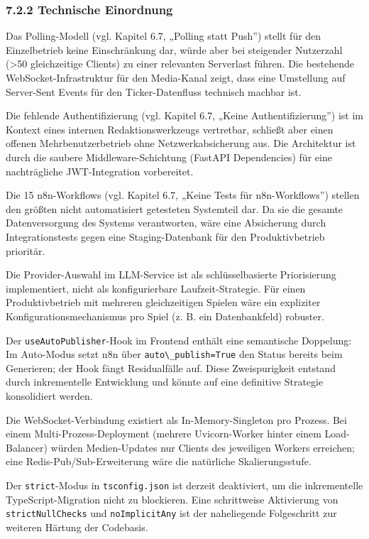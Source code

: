 \subsubsection{7.2.2 Technische Einordnung}\label{technische-einordnung}

Das Polling-Modell (vgl. Kapitel 6.7, „Polling statt Push'') stellt für
den Einzelbetrieb keine Einschränkung dar, würde aber bei steigender
Nutzerzahl (\textgreater50 gleichzeitige Clients) zu einer relevanten
Serverlast führen. Die bestehende WebSocket-Infrastruktur für den
Media-Kanal zeigt, dass eine Umstellung auf Server-Sent Events für den
Ticker-Datenfluss technisch machbar ist.

Die fehlende Authentifizierung (vgl. Kapitel 6.7, „Keine
Authentifizierung'') ist im Kontext eines internen Redaktionswerkzeugs
vertretbar, schließt aber einen offenen Mehrbenutzerbetrieb ohne
Netzwerkabsicherung aus. Die Architektur ist durch die saubere
Middleware-Schichtung (FastAPI Dependencies) für eine nachträgliche
JWT-Integration vorbereitet.

Die 15 n8n-Workflows (vgl. Kapitel 6.7, „Keine Tests für
n8n-Workflows'') stellen den größten nicht automatisiert getesteten
Systemteil dar. Da sie die gesamte Datenversorgung des Systems
verantworten, wäre eine Absicherung durch Integrationstests gegen eine
Staging-Datenbank für den Produktivbetrieb prioritär.

Die Provider-Auswahl im LLM-Service ist als schlüsselbasierte
Priorisierung implementiert, nicht als konfigurierbare
Laufzeit-Strategie. Für einen Produktivbetrieb mit mehreren
gleichzeitigen Spielen wäre ein expliziter Konfigurationsmechanismus pro
Spiel (z. B. ein Datenbankfeld) robuster.

Der \passthrough{\lstinline!useAutoPublisher!}-Hook im Frontend enthält
eine semantische Doppelung: Im Auto-Modus setzt n8n über
\passthrough{\lstinline!auto\_publish=True!} den Status bereits beim
Generieren; der Hook fängt Residualfälle auf. Diese Zweispurigkeit
entstand durch inkrementelle Entwicklung und könnte auf eine definitive
Strategie konsolidiert werden.

Die WebSocket-Verbindung existiert als In-Memory-Singleton pro Prozess.
Bei einem Multi-Prozess-Deployment (mehrere Uvicorn-Worker hinter einem
Load-Balancer) würden Medien-Updates nur Clients des jeweiligen Workers
erreichen; eine Redis-Pub/Sub-Erweiterung wäre die natürliche
Skalierungsstufe.

Der \passthrough{\lstinline!strict!}-Modus in
\passthrough{\lstinline!tsconfig.json!} ist derzeit deaktiviert, um die
inkrementelle TypeScript-Migration nicht zu blockieren. Eine
schrittweise Aktivierung von \passthrough{\lstinline!strictNullChecks!}
und \passthrough{\lstinline!noImplicitAny!} ist der naheliegende
Folgeschritt zur weiteren Härtung der Codebasis.

